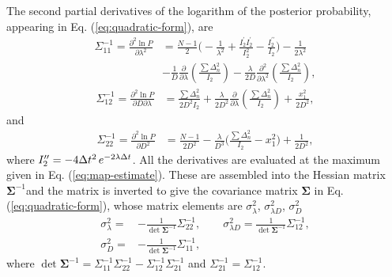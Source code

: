 \documentclass[english,aps, twocolumn, pre,superscriptaddress]{revtex4-1}
\begin{document}
The second partial derivatives of the logarithm of the posterior probability, appearing in Eq. (\ref{eq:quadratic-form}),
are 
\begin{align*}
\Sigma_{11}^{-1}=\frac{\partial^{2}\ln P}{\partial\lambda^{2}} & =\frac{N-1}{2}\Big(-\frac{1}{\lambda^{2}}+\frac{I_{2}^{\prime}I_{2}^{\prime}}{I_{2}^{2}}-\frac{I_{2}^{\prime\prime}}{I_{2}}\Big)-\frac{1}{2\lambda^{2}}\nonumber\\
 & -\frac{1}{D}\frac{\partial}{\partial\lambda}\left(\frac{\sum\Delta_{n}^{2}}{I_{2}}\right)-\frac{\lambda}{2D}\frac{\partial^{2}}{\partial\lambda^{2}}\left(\frac{\sum\Delta_{n}^{2}}{I_{2}}\right),
\end{align*}
\begin{align*}
\Sigma_{12}^{-1}=\frac{\partial^{2}\ln P}{\partial D\partial\lambda} & =\frac{\sum\Delta_{n}^{2}}{2D^{2}I_{2}}+\frac{\lambda}{2D^{2}}\frac{\partial}{\partial\lambda}\left(\frac{\sum\Delta_{n}^{2}}{I_{2}}\right)+\frac{x_{1}^{2}}{2D^{2}},
\end{align*}
and
\begin{align*}
\Sigma_{22}^{-1}=\frac{\partial^{2}\ln P}{\partial D^{2}} & =\frac{N-1}{2D^{2}}-\frac{\lambda}{D^{3}}\Big(\frac{\sum\Delta_{n}^{2}}{I_{2}}-x_{1}^{2}\Big)+\frac{1}{2D^{2}},
\end{align*}
where $I_{2}^{\prime\prime}=-4\Delta t^{2}\thinspace e^{-2\lambda\Delta t}$.
All the derivatives are evaluated at the maximum given in Eq. (\ref{eq:map-estimate}).
These are assembled into the Hessian matrix $\boldsymbol{\Sigma}^{-1}$and
the matrix is inverted to give the covariance matrix $\boldsymbol{\Sigma}$
in Eq. (\ref{eq:quadratic-form}), whose matrix elements are $\sigma_{\lambda}^{2}$,
$\sigma_{\lambda D}^{2}$, $\sigma_{D}^{2}$ 
\begin{align*}
\sigma_{\lambda}^{2}= &  -\frac{1}{\det\boldsymbol{\Sigma}^{-1}}\Sigma_{22}^{-1},\qquad\sigma_{\lambda D}^{2}=\frac{1}{\det\boldsymbol{\Sigma}^{-1}}\Sigma_{12}^{-1},\\
\sigma_{D}^{2}= &  -\frac{1}{\det\boldsymbol{\Sigma}^{-1}}\Sigma_{11}^{-1},
\end{align*}
where $\det\boldsymbol{\Sigma}^{-1}=\Sigma_{11}^{-1}\Sigma_{22}^{-1}-\Sigma_{12}^{-1}\Sigma_{21}^{-1}$
and $\Sigma_{21}^{-1}=\Sigma_{12}^{-1}$.
\end{document}
